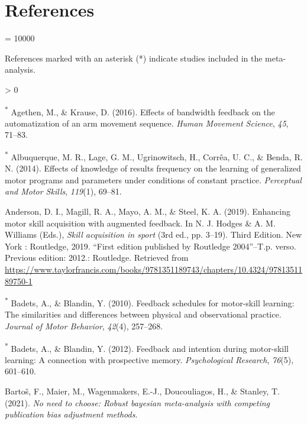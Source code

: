 \documentclass[
  english,
  man, donotrepeattitle,mask,floatsintext]{apa7}
\newlength{\cslhangindent}
\newenvironment{CSLReferences}[2] %
 {%
  \setlength{\parindent}{0pt}
  \ifodd #1 \everypar{\setlength{\hangindent}{\cslhangindent}}\ignorespaces\fi
  \ifnum #2 > 0
  \setlength{\parskip}{#2\baselineskip}
  \fi
 }%
 {}
\begin{document}
\hypertarget{references}{%
\section{References}\label{references}}

\begingroup
\interlinepenalty = 10000
\setlength{\parindent}{-0.5in}
\setlength{\leftskip}{0.5in}

References marked with an asterisk (*) indicate studies included in the meta-analysis.

\endgroup

\hypertarget{refs}{}
\begin{CSLReferences}{1}{0}
\leavevmode\hypertarget{ref-Agethen2016}{}%
\textsuperscript{*} Agethen, M., \& Krause, D. (2016). Effects of bandwidth feedback on the automatization of an arm movement sequence. \emph{Human Movement Science}, \emph{45}, 71--83.

\leavevmode\hypertarget{ref-Albuquerque2014}{}%
\textsuperscript{*} Albuquerque, M. R., Lage, G. M., Ugrinowitsch, H., Corrêa, U. C., \& Benda, R. N. (2014). Effects of knowledge of results frequency on the learning of generalized motor programs and parameters under conditions of constant practice. \emph{Perceptual and Motor Skills}, \emph{119}(1), 69--81.

\leavevmode\hypertarget{ref-Anderson2019}{}%
Anderson, D. I., Magill, R. A., Mayo, A. M., \& Steel, K. A. (2019). Enhancing motor skill acquisition with augmented feedback. In N. J. Hodges \& A. M. Williams (Eds.), \emph{Skill acquisition in sport} (3rd ed., pp. 3--19). Third Edition. {{}} New York : Routledge, 2019. {{}} {``First edition published by Routledge 2004''}--T.p. verso. {{}} Previous edition: 2012.: Routledge. Retrieved from \url{https://www.taylorfrancis.com/books/9781351189743/chapters/10.4324/9781351189750-1}

\leavevmode\hypertarget{ref-Badets2010}{}%
\textsuperscript{*} Badets, A., \& Blandin, Y. (2010). Feedback schedules for motor-skill learning: The similarities and differences between physical and observational practice. \emph{Journal of Motor Behavior}, \emph{42}(4), 257--268.

\leavevmode\hypertarget{ref-Badets2012}{}%
\textsuperscript{*} Badets, A., \& Blandin, Y. (2012). Feedback and intention during motor-skill learning: A connection with prospective memory. \emph{Psychological Research}, \emph{76}(5), 601--610.

\leavevmode\hypertarget{ref-Bartos2021}{}%
Bartoš, F., Maier, M., Wagenmakers, E.-J., Doucouliagos, H., \& Stanley, T. (2021). \emph{No need to choose: Robust bayesian meta-analysis with competing publication bias adjustment methods}.


\end{CSLReferences}
\end{document}
